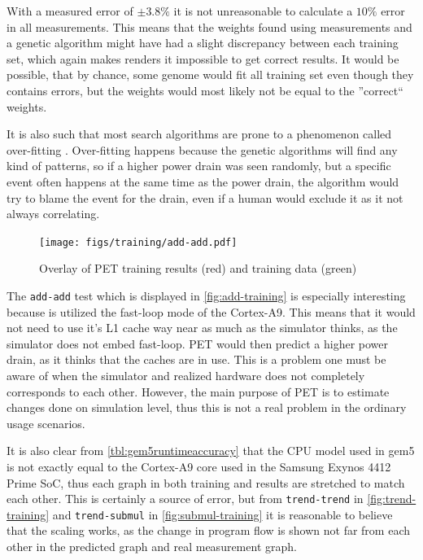 With a measured error of $\pm3.8\%$ it is not unreasonable to calculate a $10\%$ error in
all measurements. This means that the weights found using measurements and a genetic algorithm might
have had a slight discrepancy between each training set, which again makes renders it impossible to get
correct results. It would be possible, that by chance, some genome would fit all training set even though
they contains errors, but the weights would most likely not be equal to the ''correct`` weights.

It is also such that most search algorithms are prone to a phenomenon called
over-fitting \cite{russellnorvig}.  Over-fitting happens because the genetic
algorithms will find any kind of patterns, so if a higher power drain was seen
randomly, but a specific event often happens at the same time as the power
drain, the algorithm would try to blame the event for the drain, even if a human
would exclude it as it not always correlating.

\begin{figure}[ht]
\centering
\texttt{[image: figs/training/add-add.pdf]}
\caption{Overlay of PET training results (red) and training data (green)}
\label{fig:add-training}
\end{figure}

The \texttt{add-add} test which is displayed in \autoref{fig:add-training} is
especially interesting because is utilized the fast-loop mode of the Cortex-A9.
This means that it would not need to use it's L1 cache way near as much as the
simulator thinks, as the simulator does not embed fast-loop. PET would then
predict a higher power drain, as it thinks that the caches are in use. This is
a problem one must be aware of when the simulator and realized hardware does not
completely corresponds to each other. However, the main purpose of PET is to
estimate changes done on simulation level, thus this is not a real problem in the
ordinary usage scenarios.

It is also clear from \autoref{tbl:gem5runtimeaccuracy} that the CPU model used
in gem5 is not exactly equal to the Cortex-A9 core used in the Samsung Exynos
4412 Prime SoC, thus each graph in both training and results are stretched to
match each other. This is certainly a source of error, but from
\texttt{trend-trend} in \autoref{fig:trend-training} and \texttt{trend-submul}
in \autoref{fig:submul-training} it is reasonable to believe that the scaling
works, as the change in program flow is shown not far from each other in the
predicted graph and real measurement graph.
